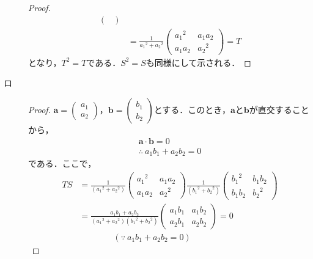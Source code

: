\documentclass[uplatex,dvipdfmx,a4paper,10pt,fleqn]{jsarticle}
\begin{document}
\begin{tleftbar}
\begin{description}
\begin{proof}
\begin{align*}
\begin{pmatrix}
        \end{pmatrix}
        \\
        &= \frac{1}{{a_1}^2+{a_2}^2}
        \begin{pmatrix}
            {a_1}^2 & a_1 a_2 \\
            a_1 a_2 & {a_2}^2
        \end{pmatrix}
        =T
    \end{align*}
    となり，$T^2=T$である．$S^2=S$も同様にして示される．
\end{proof}
\item[ロ]
    \begin{proof}
        $\bm{a}=
        \begin{pmatrix}
            a_1 \\
            a_2
        \end{pmatrix}
        $，$\bm{b}=
        \begin{pmatrix}
            b_1 \\
            b_2
        \end{pmatrix}
        $とする．このとき，$\bm{a}$と$\bm{b}$が直交することから，
        \begin{gather*}
            \bm{a} \cdot \bm{b}=0 \\
            \therefore ~a_1 b_1 + a_2 b_2 =0
        \end{gather*}
        である．ここで，
        \begin{align*}
            TS & = \frac{1}{({a_1}^2 +{a_2}^2)}
            \begin{pmatrix}
                {a_1}^2 & a_1 a_2 \\
                a_1 a_2 & {a_2}^2
            \end{pmatrix}
            \frac{1}{({b_1}^2 +{b_2}^2)}
            \begin{pmatrix}
                {b_1}^2 & b_1 b_2 \\
                b_1 b_2 & {b_2}^2
            \end{pmatrix}
            \\
            &=\frac{a_1 b_1 + a_2 b_2}{({a_1}^2 +{a_2}^2)({b_1}^2 +{b_2}^2)}
            \begin{pmatrix}
                a_1 b_1 & a_1 b_2 \\
                a_2 b_1 & a_2 b_2
            \end{pmatrix}
            =0 \\
            & \qquad \qquad  (\because ~ a_1 b_1 + a_2 b_2 =0)
        \end{align*}

\end{proof}
\end{description}
\end{tleftbar}
\end{document}
